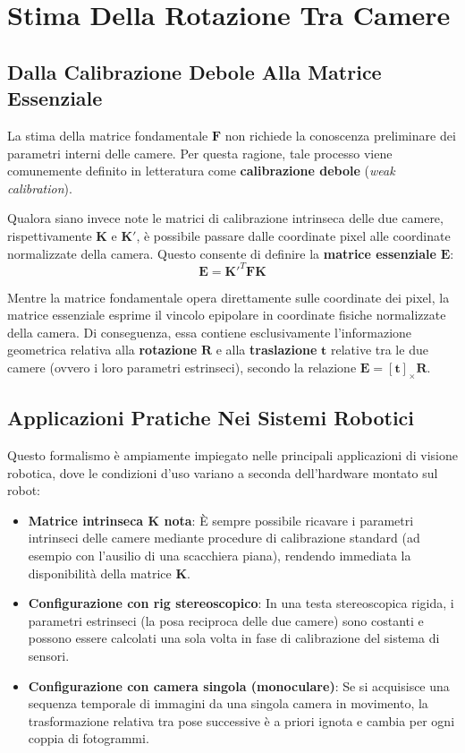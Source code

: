 ﻿\documentclass[11pt, a4paper]{article}
\begin{document}
\newpage

\section{Stima Della Rotazione Tra Camere}

\subsection{Dalla Calibrazione Debole Alla Matrice Essenziale}

La stima della matrice fondamentale $\bm{F}$ non richiede la conoscenza preliminare dei parametri interni delle camere. Per questa ragione, tale processo viene comunemente definito in letteratura come \textbf{calibrazione debole} (\emph{weak calibration}).

Qualora siano invece note le matrici di calibrazione intrinseca delle due camere, rispettivamente $\bm{K}$ e $\bm{K}'$, è possibile passare dalle coordinate pixel alle coordinate normalizzate della camera. Questo consente di definire la \textbf{matrice essenziale} $\bm{E}$:
\[ \boxed{\bm{E} = \bm{K}'^T \bm{F}\bm{K}} \]

Mentre la matrice fondamentale opera direttamente sulle coordinate dei pixel, la matrice essenziale esprime il vincolo epipolare in coordinate fisiche normalizzate della camera. Di conseguenza, essa contiene esclusivamente l'informazione geometrica relativa alla \textbf{rotazione} $\bm{R}$ e alla \textbf{traslazione} $\bm{t}$ relative tra le due camere (ovvero i loro parametri estrinseci), secondo la relazione $\bm{E} = [\bm{t}]_{\times}\bm{R}$.

\subsection{Applicazioni Pratiche Nei Sistemi Robotici}

Questo formalismo è ampiamente impiegato nelle principali applicazioni di visione robotica, dove le condizioni d'uso variano a seconda dell'hardware montato sul robot:

\begin{itemize}
    \item \textbf{Matrice intrinseca $\bm{K}$ nota}: È sempre possibile ricavare i parametri intrinseci delle camere mediante procedure di calibrazione standard (ad esempio con l'ausilio di una scacchiera piana), rendendo immediata la disponibilità della matrice $\bm{K}$.
    \item \textbf{Configurazione con rig stereoscopico}: In una testa stereoscopica rigida, i parametri estrinseci (la posa reciproca delle due camere) sono costanti e possono essere calcolati una sola volta in fase di calibrazione del sistema di sensori.
    \item \textbf{Configurazione con camera singola (monoculare)}: Se si acquisisce una sequenza temporale di immagini da una singola camera in movimento, la trasformazione relativa tra pose successive è a priori ignota e cambia per ogni coppia di fotogrammi.
\end{itemize}
\end{document}

